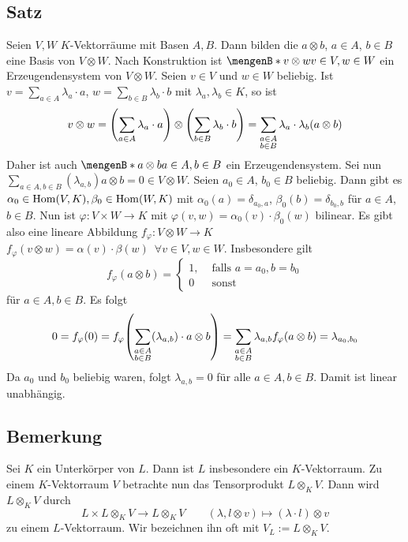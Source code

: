 \subsection[Satz: Zusammensetzung einer Basis von $V \otimes W$ durch Basen von $V$ und $W$]{Satz} %
\label{sub:109}
Seien $V,W$ $K$-Vektorräume mit Basen $A,B$. Dann bilden die $a \otimes b$, $a \in A$, $b \in B$ eine Basis von $V \otimes W$.
Nach Konstruktion ist $\set[v \otimes w]{v \in V, w \in W} $ ein Erzeugendensystem von $V \otimes W$. Seien $v \in V$ und $w \in W$ beliebig. Ist 
$v= \sum_{a \in A} \lambda_a \cdot a$, $w=\sum_{b \in B} \lambda_b \cdot b$ mit $\lambda_a, \lambda_b \in K$, so ist 
\[
	v \otimes w = \enbrace*{\sum_{a \in A} \lambda_a \cdot a} \otimes \enbrace*{\sum_{b \in B} \lambda_b \cdot b} =\sum_{\substack{a \in A \\ b \in B}} \lambda_a \cdot 
	\lambda_b (a \otimes b)
\]
Daher ist auch $\set[a \otimes b]{a \in A, b \in B} $ ein Erzeugendensystem. Sei nun $\sum_{a \in A, b \in B} (\lambda_{a,b}) a \otimes b = 0 \in V \otimes W$. Seien 
$a_0 \in A$, $b_0 \in B$ beliebig. Dann gibt es $\alpha_0 \in \Hom(V,K), \beta_0 \in \Hom(W,K)$ mit $\alpha_0 (a)= \delta_{a_0, a}$, $\beta_0(b)=\delta_{b_0, b}$ für
$a \in A$, $b \in B$. Nun ist $\varphi : V \times W \to K$ mit $\varphi(v,w)= \alpha_0(v) \cdot \beta_0(w)$ bilinear. Es gibt also eine lineare Abbildung 
$f_\varphi : V \otimes W \to K$ $f_\varphi(v \otimes w) = \alpha(v) \cdot \beta(w) \enspace\forall v \in V, w \in W$. Insbesondere gilt 
\[
	f_\varphi (a \otimes b) = \begin{cases}
		1, &\text{ falls }a=a_0 , b=b_0\\
		0 &\text{ sonst}
	\end{cases}
\]
für $a \in A, b \in B$. Es folgt
\[
	0 = f_\varphi (0) = f_\varphi \enbrace*{\sum_{\substack{a \in A \\b \in B}} (\lambda_{a,b}) \cdot  a \otimes b} = \sum_{\substack{a \in A \\ b \in B}} \lambda_{a,b}
	f_\varphi (a \otimes b) = \lambda_{a_0, b_0} 
\]
Da $a_0$ und $b_0$ beliebig waren, folgt $\lambda_{a,b}=0$ für alle $a \in A, b \in B$. Damit ist  linear unabhängig. \bewende 

\subsection[Bemerkung über den Vektorraum $V_L$]{Bemerkung} %
\label{sub:1010}
Sei $K$ ein Unterkörper von $L$. Dann ist $L$ insbesondere ein $K$-Vektorraum. Zu einem $K$-Vektorraum $V$ betrachte nun das Tensorprodukt $L \otimes_K V$. Dann wird
$L \otimes_K V$ durch
\[
	L \times L \otimes_K V \to L \otimes_K V \qquad (\lambda , l \otimes v) \mapsto(\lambda \cdot l) \otimes v
\]
zu einem $L$-Vektorraum. Wir bezeichnen ihn oft mit $V_L := L \otimes_K V$.

